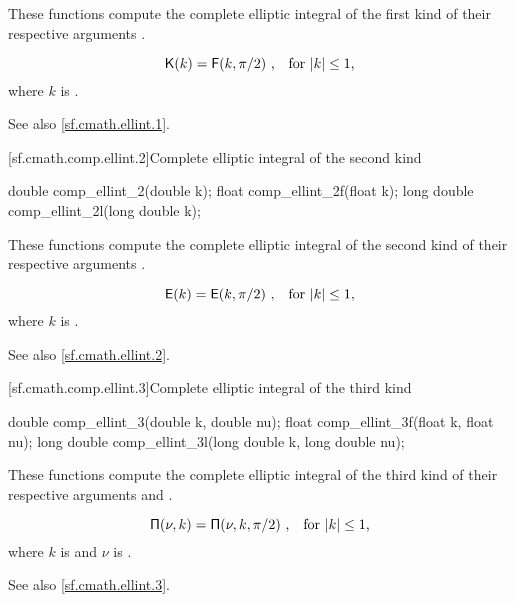 \begin{itemdescr}
\pnum
\effects
These functions compute
the complete elliptic integral of the first kind
of their respective arguments
.

\pnum
\returns
\[ \mathsf{K}(k) = \mathsf{F}(k, \pi / 2) \text{ ,\quad for $|k| \le 1$,} \]
where
$k$ is .

\pnum
See also \ref{sf.cmath.ellint.1}.
\end{itemdescr}

[sf.cmath.comp.ellint.2]{Complete elliptic integral of the second kind}%
%
%
%
%
%
\begin{itemdecl}
double       comp_ellint_2(double k);
float        comp_ellint_2f(float k);
long double  comp_ellint_2l(long double k);
\end{itemdecl}

\begin{itemdescr}
\pnum
\effects
These functions compute
the complete elliptic integral of the second kind
of their respective arguments
.

\pnum
\returns
\[ \mathsf{E}(k) = \mathsf{E}(k, \pi / 2) \text{ ,\quad for $|k| \le 1$,} \]
where
$k$ is .

\pnum
See also \ref{sf.cmath.ellint.2}.
\end{itemdescr}

[sf.cmath.comp.ellint.3]{Complete elliptic integral of the third kind}%
%
%
%
%
%
\begin{itemdecl}
double       comp_ellint_3(double k, double nu);
float        comp_ellint_3f(float k, float nu);
long double  comp_ellint_3l(long double k, long double nu);
\end{itemdecl}

\begin{itemdescr}
\pnum
\effects
These functions compute
the complete elliptic integral of the third kind
of their respective arguments
 and .

\pnum
\returns
\[ \mathsf{\Pi}(\nu, k) = \mathsf{\Pi}(\nu, k, \pi / 2) \text{ ,\quad for $|k| \le 1$,} \]
where
$k$ is  and
$\nu$ is .

\pnum
See also \ref{sf.cmath.ellint.3}.
\end{itemdescr}

